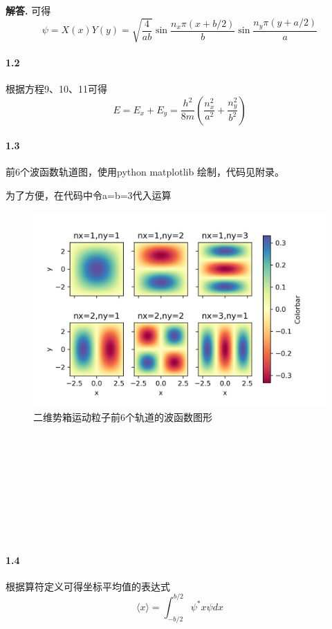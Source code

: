 \documentclass[12pt, a4paper, oneside]{ctexart}
\newenvironment{solution}{\par\noindent\textbf{解答. }}{\\\par}
\begin{document}
\begin{solution}
    可得
    \begin{equation}
        \psi=X(x)Y(y)=\sqrt{\frac{4}{ab}}\sin\frac{n_x\pi (x+b/2)}{b}\sin\frac{n_y\pi (y+a/2)}{a}
    \end{equation}

    \paragraph{1.2}

    根据方程9、10、11可得
    \begin{equation}
        E=E_x+E_y=\frac{h^2}{8m}(\frac{n_x^2}{a^2}+\frac{n_y^2}{b^2})
    \end{equation}

    \paragraph{1.3}
    
    前6个波函数轨道图，使用python matplotlib 绘制，代码见附录。

    为了方便，在代码中令a=b=3代入运算

    \begin{figure}[h]
        \centering
        \includegraphics{WaveFunction.jpg}
        \caption{二维势箱运动粒子前6个轨道的波函数图形}
    \end{figure}

\

\

\

\

\

    \paragraph{1.4}
    根据算符定义可得坐标平均值的表达式
    \begin{equation}
        \langle x \rangle = \int _{-b/2}^{b/2}\psi^*x\psi dx 
    \end{equation}


\end{solution}
\end{document}
